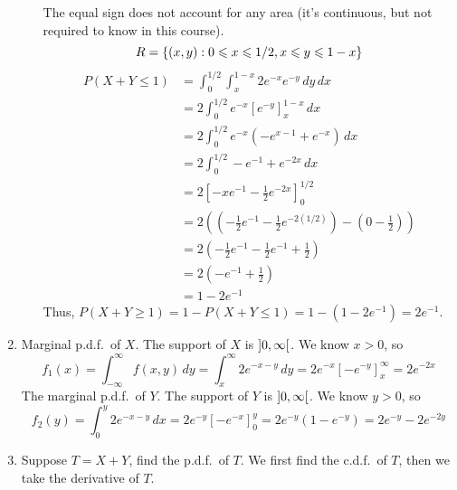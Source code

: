 \begin{Example}{}{}
\begin{enumerate}[label=(\roman*)]
\begin{enumerate}[label=(\alph*)]
                        The equal sign does not account for any area (it's continuous,
                        but not required to know in this course).
                        \[ R=\{(x,y):0\leqslant x\leqslant 1/2,x\leqslant y\leqslant 1-x\} \]
                        \begin{align*}
                            P(X+Y\leqslant 1)
                             & =\int_{0}^{1/2} \int_{x}^{1-x} 2e^{-x}e^{-y}\, d{y} \, d{x}         \\
                             & =2\int_{0}^{1/2} e^{-x}\left[ e^{-y} \right]_{x}^{1-x}\, d{x}       \\
                             & =2 \int_{0}^{1/2} e^{-x}\left( -e^{x-1}+e^{-x} \right)\, d{x}       \\
                             & =2 \int_{0}^{1/2} -e^{-1}+e^{-2x}\, d{x}                            \\
                             & =2 \left[ -xe^{-1}-\frac{1}{2} e^{-2x} \right]_0^{1/2}              \\
                             & =2\left( \left( -\frac{1}{2} e^{-1}-\frac{1}{2} e^{-2(1/2)} \right)
                            -\left( 0-\frac{1}{2} \right) \right)                                  \\
                             & =2\left( -\frac{1}{2} e^{-1}-\frac{1}{2} e^{-1}+\frac{1}{2}
                            \right)                                                                \\
                             & =2\left( -e^{-1}+\frac{1}{2} \right)                                \\
                             & =1-2e^{-1}
                        \end{align*}
                        Thus, $ P(X+Y\geqslant 1)=1-P(X+Y\leqslant 1)
                            =1-\left( 1-2e^{-1} \right)=2e^{-1} $.
              \end{enumerate}
        \item Marginal p.d.f.\ of $ X $. The support of $ X $ is
              $ \interval[open]{0}{\infty} $. We know $ x>0 $, so
              \[ f_1(x)=
                  \int_{-\infty}^{\infty} f(x,y)\, d{y}
                  =\int_{x}^{\infty} 2e^{-x-y}\, d{y}
                  =2e^{-x}\left[ -e^{-y} \right]_x^\infty=2e^{-2x} \]
              The marginal p.d.f.\ of $ Y $. The support of $ Y $ is
              $ \interval[open]{0}{\infty} $. We know $ y>0 $, so
              \[ f_2(y)=
                  \int_{0}^{y}2e^{-x-y}\, d{x} =
                  2e^{-y}\left[ -e^{-x} \right]_0^y
                  =2e^{-y}\left( 1-e^{-y} \right)=
                  2e^{-y}-2e^{-2y} \]
        \item Suppose $ T=X+Y $, find the p.d.f.\ of $ T $.
              We first find the c.d.f.\ of $ T $, then we take the derivative
              of $ T $.


\end{enumerate}
\end{Example}
